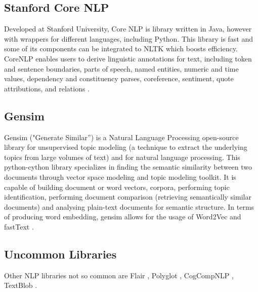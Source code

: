         \subsection{Stanford Core NLP}

        \par Developed at Stanford University, Core NLP is library written in Java, however with wrappers for different languages, including Python. This library is fast and some of its components can be integrated to NLTK which boosts efficiency. CoreNLP enables users to derive linguistic annotations for text, including token and sentence boundaries, parts of speech, named entities, numeric and time values, dependency and constituency parses, coreference, sentiment, quote attributions, and relations \cite{Manning2015}.


        \subsection{Gensim}

        \par Gensim ("Generate Similar”) is a Natural Language Processing open-source library for unsupervised topic modeling (a technique to extract the underlying topics from large volumes of text)  and for natural language processing. This python-cython library specializes in finding the semantic similarity between two documents through vector space modeling and topic modeling toolkit. It is capable of building document or word vectors, corpora, performing topic identification, performing document comparison (retrieving semantically similar documents) and analysing plain-text documents for semantic structure. In terms of producing word embedding, gensim allows for the usage of Word2Vec and fastText \cite{rehurek_lrec}.

        
        \subsection{Uncommon Libraries}
        Other NLP libraries not so common are Flair \cite{akbik2018coling}, Polyglot \cite{polyglot:2013:ACL-CoNLL}, CogCompNLP \cite{2018_lrec_cogcompnlp}, TextBlob \cite{textblob}.
